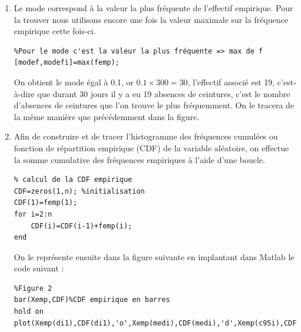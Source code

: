 \documentclass[a4paper,oneside]{article}
\begin{document}
\begin{enumerate}
\begin{lstlisting}
[maxX,maxXi]=max(Xemp); %on récupère le max des fréquence, ainsi que l'indice de ce max
[minX,minXi]=min(Xemp);
\end{lstlisting}

Nous utiliserons cet indice pour le tracer dans la figure.
On obtient le minimum égal à 7, c'est-à-dire qu'au minimum il y a eu 7 absences de ceinture et qu'au maximum il y a eu 30 absences de ceinture de sécurité.\\

\item

Le mode correspond à la valeur la plus fréquente de l'effectif empirique.
Pour la trouver nous utilisons encore une fois la valeur maximale sur la fréquence empirique cette fois-ci.

\begin{lstlisting}
%Pour le mode c'est la valeur la plus fréquente => max de f
[modef,modefi]=max(femp);
\end{lstlisting}

On obtient le mode égal à 0.1, or $0.1\times 300 =30$, l'effectif associé est 19, c'est-à-dire que durant 30 jours il y a eu 19 absences de ceintures, c'est le nombre d'absences de ceintures que l'on trouve le plus fréquemment.
On le tracera de la même manière que précédemment dans la figure.\\

\item

Afin de construire et de tracer l'histogramme des fréquences cumulées ou fonction de répartition empirique (CDF) de la variable aléatoire, on effectue la somme cumulative des fréquences empiriques à l'aide d'une boucle.

\begin{lstlisting}
% calcul de la CDF empirique
CDF=zeros(1,n); %initialisation
CDF(1)=femp(1);
for i=2:n
    CDF(i)=CDF(i-1)+femp(i);
end
\end{lstlisting}


On le représente ensuite dans la figure suivante en implantant dans Matlab le code suivant :

\begin{lstlisting}
%Figure 2
bar(Xemp,CDF)%CDF empirique en barres
hold on
plot(Xemp(di1),CDF(di1),'o',Xemp(medi),CDF(medi),'d',Xemp(c95i),CDF(c95i),'x')
\end{lstlisting}


\end{enumerate}
\end{document}
